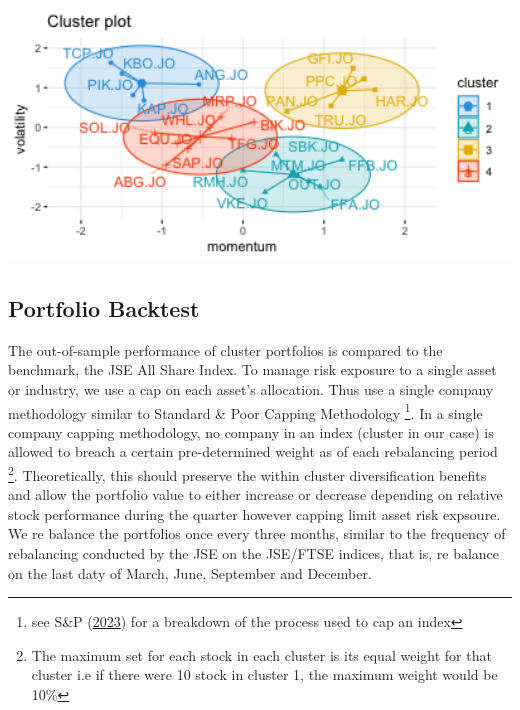 \documentclass[11pt,preprint, authoryear]{elsarticle}
\let\origfigure\figure
\let\endorigfigure\endfigure
\renewenvironment{figure}[1][2] {
    \expandafter\origfigure\expandafter[H]
} {
    \endorigfigure
}
\numberwithin{equation}{section}
\numberwithin{figure}{section}
\numberwithin{table}{section}
\let\rmarkdownfootnote\footnote%
\def\footnote{\protect\rmarkdownfootnote}
\begin{document}
\begin{figure}[H]

\includegraphics[width=5.56in]{images/clusters_image} \hfill{}

\caption{ Clusters Results from Highest Silhoutte \label{fig2}}\label{fig:unnamed-chunk-2}
\end{figure}

\hypertarget{portfolio-backtest}{%
\subsection{\texorpdfstring{Portfolio Backtest
\label{back}}{Portfolio Backtest }}\label{portfolio-backtest}}

The out-of-sample performance of cluster portfolios is compared to the
benchmark, the JSE All Share Index. To manage risk exposure to a single
asset or industry, we use a cap on each asset's allocation. Thus use a
single company methodology similar to Standard \& Poor Capping
Methodology \footnote{see S\&P (\protect\hyperlink{ref-sp}{2023}) for a
  breakdown of the process used to cap an index}. In a single company
capping methodology, no company in an index (cluster in our case) is
allowed to breach a certain pre-determined weight as of each rebalancing
period \footnote{The maximum set for each stock in each cluster is its
  equal weight for that cluster i.e if there were 10 stock in cluster 1,
  the maximum weight would be 10\%}. Theoretically, this should preserve
the within cluster diversification benefits and allow the portfolio
value to either increase or decrease depending on relative stock
performance during the quarter however capping limit asset risk
expsoure. We re balance the portfolios once every three months, similar
to the frequency of rebalancing conducted by the JSE on the JSE/FTSE
indices, that is, re balance on the last daty of March, June, September
and December.
\end{document}
